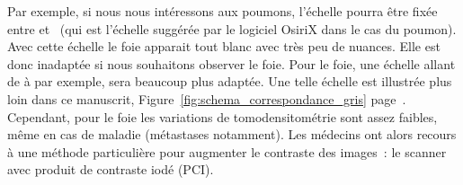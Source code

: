 \documentclass[main.tex]{subfiles}
\begin{document}
Par exemple, si nous nous intéressons aux poumons, l'échelle pourra être fixée entre  et~ (qui est l'échelle suggérée par le logiciel OsiriX dans le cas du poumon). Avec cette échelle le foie apparait tout blanc avec très peu de nuances. Elle est donc inadaptée si nous  souhaitons observer le foie. Pour le foie, une échelle allant de  à  par exemple, sera beaucoup plus adaptée. 
Une telle échelle est illustrée plus loin dans ce manuscrit, \cf Figure~\ref{fig:schema_correspondance_gris} page~\pageref{fig:schema_correspondance_gris}.
Cependant, pour le foie les variations de tomodensitométrie sont assez faibles, même en cas de maladie (métastases notamment). Les médecins ont alors recours à une méthode particulière pour augmenter le contraste des images~: le scanner avec produit de contraste iodé (PCI).
\end{document}
